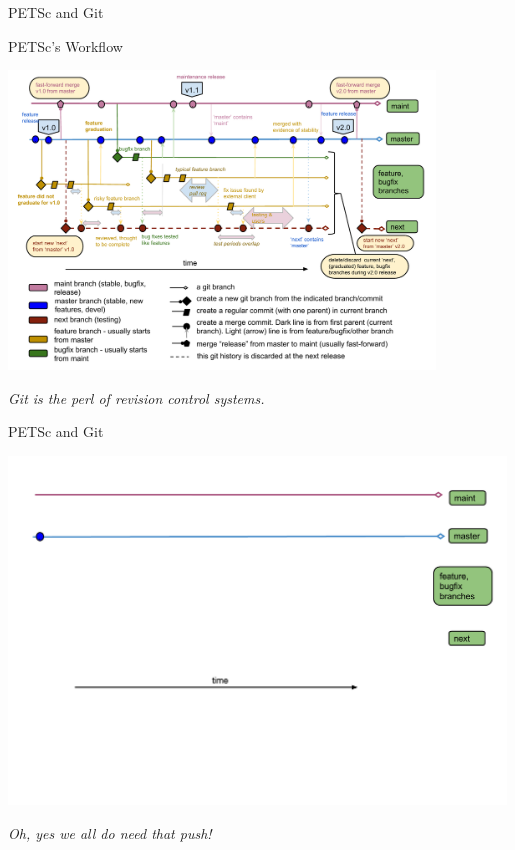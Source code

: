 

\begin{frame}{PETSc and Git}
  \begin{block}{PETSc's Workflow}
  \begin{center}
    \includegraphics[width=0.85\textwidth]{figures/gitworkflows-satish}
  \end{center}
  \end{block}

  \begin{flushright} \vspace*{-0.5cm}
   \textit{Git is the perl of revision control systems.}
  \end{flushright}
\end{frame}


\begin{frame}{PETSc and Git}
  \begin{center}
    \includegraphics[width=0.99\textwidth]{figures/gitworkflows-45}
  \end{center}
  \begin{flushright} \vspace*{-0.5cm}
   \textit{Oh, yes we all do need that push!}
  \end{flushright}
\end{frame}


